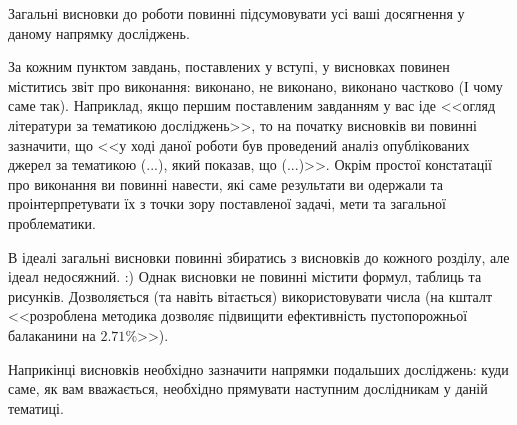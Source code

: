 Загальні висновки до роботи повинні підсумовувати усі ваші досягнення у
даному напрямку досліджень.

За кожним пунктом завдань, поставлених у вступі, у висновках повинен
міститись звіт про виконання: виконано, не виконано, виконано частково (І
чому саме так). Наприклад, якщо першим поставленим завданням у вас іде
<<огляд літератури за тематикою досліджень>>, то на початку висновків ви
повинні зазначити, що <<у ході даної роботи був проведений аналіз
опублікованих джерел за тематикою (...), який показав, що (...)>>. Окрім
простої констатації про виконання ви повинні навести, які саме результати
ви одержали та проінтерпретувати їх з точки зору поставленої задачі, мети
та загальної проблематики.

В ідеалі загальні висновки повинні збиратись з висновків до кожного
розділу, але ідеал недосяжний. :) Однак висновки не повинні містити
формул, таблиць та рисунків. Дозволяється (та навіть вітається)
використовувати числа (на кшталт <<розроблена методика дозволяє підвищити
ефективність пустопорожньої балаканини на $2.71\%$>>).

Наприкінці висновків необхідно зазначити напрямки подальших досліджень:
куди саме, як вам вважається, необхідно прямувати наступним дослідникам у
даній тематиці.
